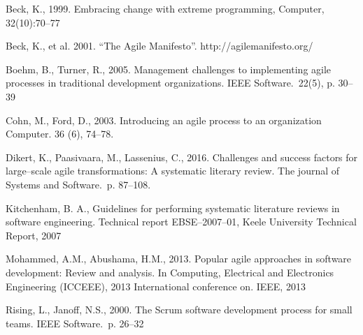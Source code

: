 \noindent [1] Beck, K., 1999. Embracing change with extreme programming, Computer,
32(10):70–77

\noindent [2] Beck, K., et al. 2001. ``The Agile Manifesto''.
http://agilemanifesto.org/

\noindent [3] Boehm, B., Turner, R., 2005. Management challenges to implementing agile
processes in traditional development organizations. IEEE Software.\ 22(5), p. 30–39

\noindent [4] Cohn, M., Ford, D., 2003. Introducing an agile process to an
organization Computer. 36 (6), 74–78.

\noindent [5] Dikert, K., Paasivaara, M., Lassenius, C., 2016. Challenges and success factors
for large–scale agile transformations: A systematic literary review. The journal
of Systems and Software.\ p. 87–108.

\noindent [6] Kitchenham, B. A., Guidelines for performing systematic literature
reviews in software engineering. Technical report EBSE–2007–01, Keele University
Technical Report, 2007

\noindent [7] Mohammed, A.M., Abushama, H.M., 2013. Popular agile approaches in software
development: Review and analysis. In Computing, Electrical and Electronics
Engineering (ICCEEE), 2013 International conference on. IEEE, 2013

\noindent [8] Rising, L., Janoff, N.S., 2000. The Scrum software development process for small teams. IEEE Software.\ p. 26–32
